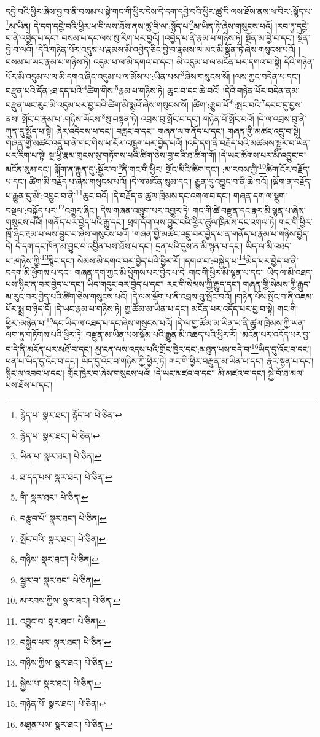དབྱེ་བའི་ཕྱིར་ཞེས་བྱ་བ་ནི་བསམ་པ་སྟེ་གང་གི་ཕྱིར་དེས་དེ་དག་དབྱེ་བའི་ཕྱིར་ཚུ་བི་ལས་ཐོས་ནས་ཕ་བིར་:སྙོད་པ་\footnote{རྙེད་པ་  སྣར་ཐང་། རྙོད་པ་  པེ་ཅིན། }མ་ཡིན། དེ་དག་དབྱེ་བའི་ཕྱིར་ཕ་བི་ལས་ཐོས་ནས་ཚུ་བི་ལ་:སྙོད་པ་\footnote{རྙེད་པ་  སྣར་ཐང་།  པེ་ཅིན། }མ་ཡིན་ཏེ་ཞེས་གསུངས་པའོ། །རབ་ཏུ་དབྱེ་བ་ནི་འབྱེད་པ་དང་། བསམ་པ་དང་ལས་སུ་རིག་པར་བྱའོ། །འབྱེད་པ་ནི་རྣམ་པ་གཉིས་ཏེ། སྔོན་མ་བྱེ་བ་དང་། སྔོན་བྱེ་བ་ལའོ། །དེའི་གཉེན་པོར་འདུས་པ་རྣམས་མི་འབྱེད་ཅིང་བྱེ་བ་རྣམས་ལ་ཡང་མི་སྣོན་ཏེ་ཞེས་གསུངས་པའོ། །བསམ་པ་ཡང་རྣམ་པ་གཉིས་ཏེ། འདུམ་པ་ལ་མི་དགའ་བ་དང་། མི་འདུམ་པ་ལ་མངོན་པར་དགའ་བ་སྟེ། དེའི་གཉེན་པོར་མི་འདུམ་པ་ལ་མི་དགའ་ཞིང་འདུམ་པ་ལ་མོས་པ་:ཡིན་པས་\footnote{ཡིན་པ་  སྣར་ཐང་།  པེ་ཅིན། }ཞེས་གསུངས་སོ། །ལས་ཀྱང་བདེན་པ་དང་། བརྫུན་པའི་དོན་:ཐ་དད་པའི་\footnote{ཐ་དད་པས་  སྣར་ཐང་།  པེ་ཅིན། }ཚིག་གིས་\footnote{གི་  སྣར་ཐང་།  པེ་ཅིན། }རྣམ་པ་གཉིས་ཏེ། ཆུང་བ་དང་ཆེ་བའོ། །དེའི་གཉེན་པོར་བདེན་ནམ་བརྫུན་ཡང་རུང་མི་འདུམ་པར་བྱ་བའི་ཚིག་མི་སྨྲའོ་ཞེས་གསུངས་སོ། །ཚིག་:རྩུབ་པོ་\footnote{བརྩུབ་པོ་  སྣར་ཐང་།  པེ་ཅིན། }:སྤང་བའི་\footnote{སྤོང་བའི་  སྣར་ཐང་།  པེ་ཅིན། }དབང་དུ་བྱས་ནས། སྤོང་བ་རྣམ་པ་:གཉིས་ཡོངས་\footnote{གཉིས་  སྣར་ཐང་།  པེ་ཅིན། }སུ་བསྟན་ཏེ། འབྲས་བུ་སྤོང་བ་དང་། གཉེན་པོ་སྤོང་བའོ། །དེ་ལ་འབྲས་བུ་ནི་ཀུན་དུ་སྤྱོད་པ་སྟེ། ཞེར་འདེབས་པ་དང་། བརླང་བ་དང་། གཞན་ལ་གནོད་པ་དང་། གཞན་གྱི་མཚང་འདྲུ་བ་སྟེ། གཞན་གྱི་མཚང་འདྲུ་བ་ནི་གང་གིས་ཕ་རོལ་འཁྲུག་པར་བྱེད་པའོ། །འདི་དག་ནི་བརྗོད་པའི་མཚམས་སྦྱར་བ་ཡིན་པར་རིག་པ་སྟེ། སྔ་ཕྱི་རྣམ་གྲངས་སུ་གཏོགས་པའི་ཚིག་ཅེས་བྱ་བའི་ཐ་ཚིག་གོ། །དེ་ཡང་ཚོགས་པར་མི་འབྱུང་བ་མངོན་སུམ་དང་། ལྐོག་ན་རྒྱུན་དུ་:སྦྱོར་བ་\footnote{སྦྱར་བ་  སྣར་ཐང་།  པེ་ཅིན། }ནི་གང་གི་ཕྱིར། གྲོང་མིའི་ཚིག་དང་། :མ་རབས་ཀྱི་\footnote{མ་རབས་ཀྱིས་  སྣར་ཐང་།  པེ་ཅིན། }ཚིག་ངོར་བརྗོད་པ་དང་། ཚིག་མི་བརྗོད་པ་ཞེས་གསུངས་པའོ། །དེ་ལ་མངོན་སུམ་དང་། རྒྱུན་དུ་འབྱུང་བ་ནི་ཆེ་བའོ། །ལྐོག་ན་བརྗོད་པ་རྒྱུན་དུ་མི་:འབྱུང་བ་ནི་\footnote{འབྱུང་བ་  སྣར་ཐང་།  པེ་ཅིན། }ཆུང་བའོ། །དེ་བརྗོད་ན་ཚུལ་ཁྲིམས་དང་འགལ་བ་དང་། གཞན་དག་ལ་སྡུག་བསྔལ་:བསྐྱོད་པར་\footnote{བསྐྱེད་པར་  སྣར་ཐང་།  པེ་ཅིན། }འགྱུར་ཞིང་། དེས་གཞན་འཁྲུག་པར་འགྱུར་ཏེ། གང་གི་ཚེ་བརྫུན་དང་རྣར་མི་སྙན་པ་ཞེས་གསུངས་པའོ། །གནོད་པར་བྱེད་པའི་རྒྱུ་དང་། ཕྲག་དོག་ལས་བྱུང་བའི་ཕྱིར་ཚུལ་ཁྲིམས་དང་འགལ་ཏེ། གང་གི་ཕྱིར་ཁྲོ་ཞིང་རྔམ་པ་ལས་བྱུང་བ་ཞེས་གསུངས་པའོ། །གཞན་གྱི་མཚང་འདྲུ་བར་བྱེད་པ་ན་གནོད་པ་རྣམ་པ་གཉིས་བྱེད་དེ། དེ་དག་དང་ཁོན་མ་བྱུང་བ་འབྱིན་པས་ཐོས་པ་དང་། དྲན་པའི་དུས་ན་མི་སྙན་པ་དང་། ཡིད་ལ་མི་འཐད་པ་:གཉིས་ཀྱི་\footnote{གཉིས་ཀྱིས་  སྣར་ཐང་།  པེ་ཅིན། }སྙིང་དང་། སེམས་མི་དགའ་བར་བྱེད་པའི་ཕྱིར་རོ། །དགའ་བ་:བསྐྱེད་པ་\footnote{སྐྱེས་པ་  སྣར་ཐང་།  པེ་ཅིན། }མེད་པར་བྱེད་པ་ནི་བདག་མི་ཕྱོགས་པ་དང་། གཞན་དག་ཀྱང་མི་ཕྱོགས་པར་བྱེད་པ་དེ། གང་གི་ཕྱིར་མི་སྙན་པ་དང་། ཡིད་ལ་མི་འཐད་པས་སྙིང་ན་བར་བྱེད་པ་དང་། ཡིད་གདུང་བར་བྱེད་པ་དང་། རང་གི་སེམས་ཀྱི་རྒྱུད་དང་། གཞན་གྱི་སེམས་ཀྱི་རྒྱུད་མ་རུང་བར་བྱེད་པའི་ཚིག་ཅེས་གསུངས་པའོ། །དེ་ལས་ལྡོག་པ་ནི་འབྲས་བུ་སྤོང་བའོ། །གཉེན་པོས་སྤོང་བ་ནི་འཇམ་པོར་སྨྲ་བ་ཉིད་དོ། །དེ་ཡང་རྣམ་པ་གཉིས་ཏེ། གྱ་ཚོམ་མ་ཡིན་པ་དང་། མངོན་པར་འདོད་པར་བྱ་བ་སྟེ། གང་གི་ཕྱིར་:མཉེན་པ་\footnote{གཉེན་པོ་  སྣར་ཐང་།  པེ་ཅིན། }དང་ཡིད་ལ་འཐད་པ་དང་ཞེས་གསུངས་པའོ། །དེ་ལ་གྱ་ཚོམ་མ་ཡིན་པ་ནི་ཚུལ་ཁྲིམས་ཀྱི་ཡན་ལག་ཏུ་གཏོགས་པའི་ཕྱིར་ཏེ། བརྫུན་མ་ཡིན་པས་སྡོམ་པའི་རྒྱུན་མི་འཆད་པའི་ཕྱིར་རོ། །མངོན་པར་འདོད་པར་བྱ་བ་དེ་ནི་མངོན་པར་མཐོ་བ་དང་། མྱ་ངན་ལས་འདས་པའི་གྲོང་ཁྱེར་དང་:མཐུན་པས་བདེ་བ་\footnote{མཐུན་པས་  སྣར་ཐང་།  པེ་ཅིན། }ཡིད་དུ་འོང་བ་དང་། ཕན་པ་ཡིད་དུ་འོང་བ་དང་། ཡིད་དུ་འོང་བ་གཉིས་ཀྱི་ཕྱིར་ཏེ། གང་གི་ཕྱིར་བརྫུན་མ་ཡིན་པ་དང་། རྣར་སྙན་པ་དང་། སྙིང་ལ་འབབ་པ་དང་། གྲོང་ཁྱེར་བ་ཞེས་གསུངས་པའོ། །དེ་ཡང་མཛའ་བ་དང་། མི་མཛའ་བ་དང་། སྐྱེ་བོ་ཐ་མལ་པས་ཐོས་པ་དང་། 